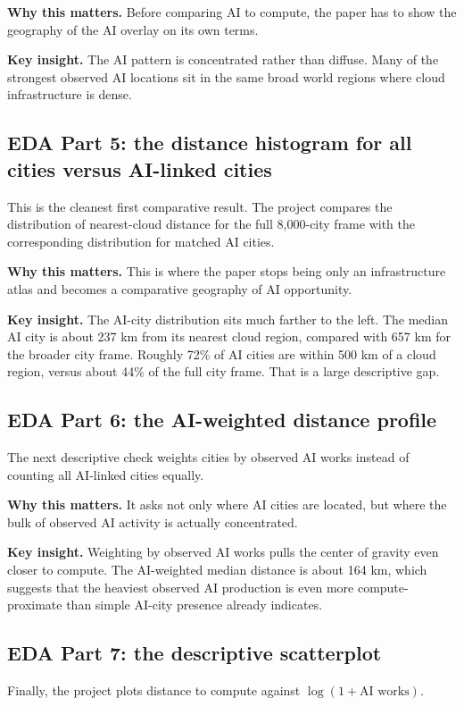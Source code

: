 \documentclass[11pt]{article}
\begin{document}
\textbf{Why this matters.} Before comparing AI to compute, the paper has to show the geography of the AI overlay on its own terms.

\textbf{Key insight.} The AI pattern is concentrated rather than diffuse. Many of the strongest observed AI locations sit in the same broad world regions where cloud infrastructure is dense.

\subsection{EDA Part 5: the distance histogram for all cities versus AI-linked cities}
This is the cleanest first comparative result. The project compares the distribution of nearest-cloud distance for the full 8{,}000-city frame with the corresponding distribution for matched AI cities.

\textbf{Why this matters.} This is where the paper stops being only an infrastructure atlas and becomes a comparative geography of AI opportunity.

\textbf{Key insight.} The AI-city distribution sits much farther to the left. The median AI city is about 237 km from its nearest cloud region, compared with 657 km for the broader city frame. Roughly 72\% of AI cities are within 500 km of a cloud region, versus about 44\% of the full city frame. That is a large descriptive gap.

\subsection{EDA Part 6: the AI-weighted distance profile}
The next descriptive check weights cities by observed AI works instead of counting all AI-linked cities equally.

\textbf{Why this matters.} It asks not only where AI cities are located, but where the bulk of observed AI activity is actually concentrated.

\textbf{Key insight.} Weighting by observed AI works pulls the center of gravity even closer to compute. The AI-weighted median distance is about 164 km, which suggests that the heaviest observed AI production is even more compute-proximate than simple AI-city presence already indicates.

\subsection{EDA Part 7: the descriptive scatterplot}
Finally, the project plots distance to compute against $\log(1 + \text{AI works})$.
\end{document}
